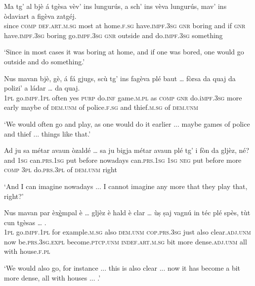 \begin{linenumbers}
	\gll Ma tg’ al bjè á tgèsa vèv’ ins lungurús, a sch’ ins vèva lungurús, mav’ ins òdaviart a figèva zatgéj.   \\
	since \textsc{comp} \textsc{def.art.m.sg} most at home.\textsc{f.sg} have.\textsc{impf.3sg} \textsc{gnr} boring and if \textsc{gnr} have.\textsc{impf.3sg} boring go.\textsc{impf.3sg} \textsc{gnr} outside and do.\textsc{impf.3sg} something\\
\end{linenumbers}
\medskip
\glt `Since in most cases it was boring at home, and if one was bored, one would go outside and do something.'
\medskip

\begin{linenumbers}
	\gll Nus mavan bjè, gè, á fá gjugs, scù tg’ ins fagèva plé baut … fòrsa da quaj da polizi’ a ládar …  da quaj.   \\
	\textsc{1pl} go.\textsc{impf.1pl} often yes \textsc{purp} do.\textsc{inf} game.\textsc{m.pl} as \textsc{comp} \textsc{gnr} do.i\textsc{mpf.3sg} more early {} maybe of \textsc{dem.unm} of police.\textsc{f.sg} and thief.\textsc{m.sg} {} of \textsc{dem.unm}\\
\end{linenumbers}
\medskip
\glt `We would often go and play, as one would do it earlier ... maybe games of police and thief ... things like that.'
\medskip

\begin{linenumbers}
	\gll Ad ju sa métar avaun òzaldé … sa ju bigja métar avaun plé tg’ i fòn da gljèz, né?    \\
	and \textsc{1sg} can.\textsc{prs.1sg} put before nowadays {} can.\textsc{prs.1sg} \textsc{1sg} \textsc{neg} put before more \textsc{comp} \textsc{3pl} do.\textsc{prs.3pl} of \textsc{dem.unm} right \\
\end{linenumbers}
\medskip
\glt `And I can imagine nowadays ... I cannot imagine any more that they play that, right?'
\medskip

\begin{linenumbers}
	\gll Nus mavan par èx\underline{è}mpal è … gljèz è hald è clar … ùṣ ṣaj vagnú in téc plé spès, tùt cun tgèsas … .   \\
	\textsc{1pl} go.\textsc{impf.1pl} for example.\textsc{m.sg} also {} \textsc{dem.unm} \textsc{cop.prs.3sg} just also clear.\textsc{adj.unm} {} now be.\textsc{prs.3sg.expl} become.\textsc{ptcp.unm} \textsc{indef.art.m.sg} bit more dense.\textsc{adj.unm} all with house.\textsc{f.pl } \\
\end{linenumbers}
\medskip
\glt `We would also go, for instance ... this is also clear ... now it has become a bit more dense, all with houses ... .'
\medskip

